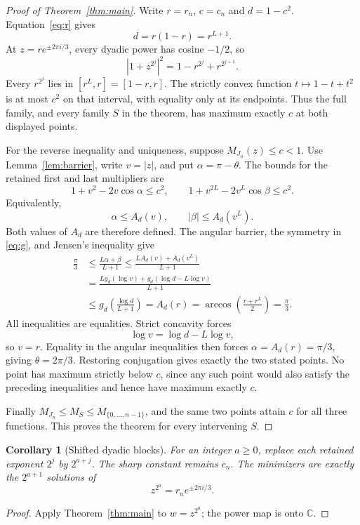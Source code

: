 \documentclass[11pt]{article}
\newtheorem{corollary}[theorem]{Corollary}
\newcommand{\C}{\mathbb C}
\begin{document}
\begin{proof}[Proof of Theorem~\ref{thm:main}]
Write $r=r_n$, $c=c_n$ and $d=1-c^2$. Equation~\eqref{eq:r} gives
\[
 d=r(1-r)=r^{L+1}.
\]
At $z=r e^{\pm2\pi i/3}$, every dyadic power has cosine $-1/2$, so
\[
 |1+z^{2^j}|^2=1-r^{2^j}+r^{2^{j+1}}.
\]
Every $r^{2^j}$ lies in $[r^L,r]=[1-r,r]$. The strictly convex function $t\mapsto1-t+t^2$ is at most $c^2$ on that interval, with equality only at its endpoints. Thus the full family, and every family $S$ in the theorem, has maximum exactly $c$ at both displayed points.

For the reverse inequality and uniqueness, suppose $M_{J_n}(z)\le c<1$. Use Lemma~\ref{lem:barrier}, write $v=|z|$, and put $\alpha=\pi-\theta$. The bounds for the retained first and last multipliers are
\[
 1+v^2-2v\cos\alpha\le c^2,
 \qquad 1+v^{2L}-2v^L\cos\beta\le c^2.
\]
Equivalently,
\[
 \alpha\le A_d(v),\qquad |\beta|\le A_d(v^L).
\]
Both values of $A_d$ are therefore defined. The angular barrier, the symmetry in \eqref{eq:g}, and Jensen's inequality give
\begin{align*}
 \frac\pi3
 &\le\frac{L\alpha+\beta}{L+1}
 \le\frac{L A_d(v)+A_d(v^L)}{L+1}\\
 &=\frac{L g_d(\log v)+g_d(\log d-L\log v)}{L+1}\\
 &\le g_d\!\left(\frac{\log d}{L+1}\right)
 =A_d(r)
 =\arccos\!\left(\frac{r+r^L}{2}\right)=\frac\pi3.
\end{align*}
All inequalities are equalities. Strict concavity forces
\[
 \log v=\log d-L\log v,
\]
so $v=r$. Equality in the angular inequalities then forces $\alpha=A_d(r)=\pi/3$, giving $\theta=2\pi/3$. Restoring conjugation gives exactly the two stated points. No point has maximum strictly below $c$, since any such point would also satisfy the preceding inequalities and hence have maximum exactly $c$.

Finally $M_{J_n}\le M_S\le M_{\{0,\ldots,n-1\}}$, and the same two points attain $c$ for all three functions. This proves the theorem for every intervening $S$.
\end{proof}

\begin{corollary}[Shifted dyadic blocks]\label{cor:shift}
For an integer $a\ge0$, replace each retained exponent $2^j$ by $2^{a+j}$. The sharp constant remains $c_n$. The minimizers are exactly the $2^{a+1}$ solutions of
\[
 z^{2^a}=r_n e^{\pm2\pi i/3}.
\]
\end{corollary}
\begin{proof}
Apply Theorem~\ref{thm:main} to $w=z^{2^a}$; the power map is onto $\C$.
\end{proof}
\end{document}
